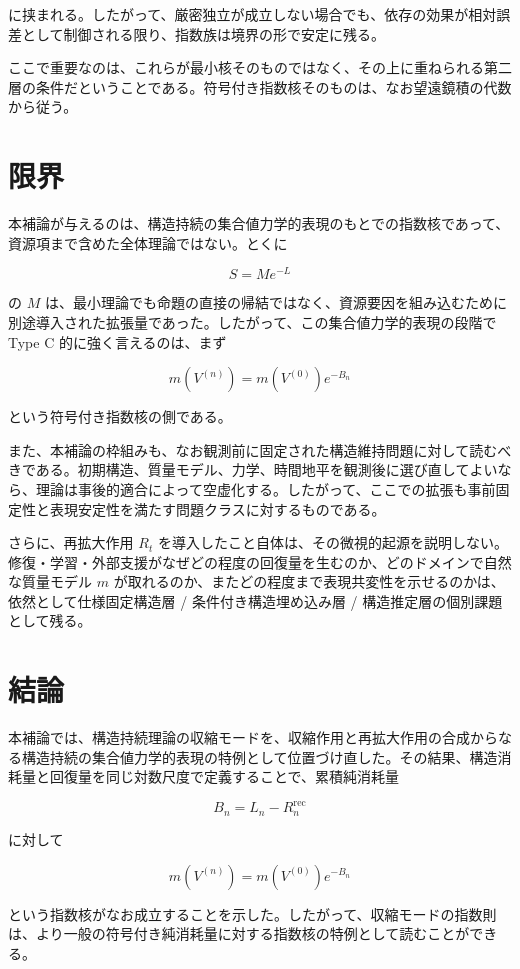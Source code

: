 \documentclass[12pt,a4paper]{article}
\begin{document}
に挟まれる。したがって、厳密独立が成立しない場合でも、依存の効果が相対誤差として制御される限り、指数族は境界の形で安定に残る。

ここで重要なのは、これらが最小核そのものではなく、その上に重ねられる第二層の条件だということである。符号付き指数核そのものは、なお望遠鏡積の代数から従う。

\section{限界}\label{ux9650ux754c}

本補論が与えるのは、構造持続の集合値力学的表現のもとでの指数核であって、資源項まで含めた全体理論ではない。とくに

\[
S = M e^{-L}
\]

の \(M\) は、最小理論でも命題の直接の帰結ではなく、資源要因を組み込むために別途導入された拡張量であった。したがって、この集合値力学的表現の段階で Type C 的に強く言えるのは、まず

\[
m(V^{(n)}) = m(V^{(0)}) e^{-B_{n}}
\]

という符号付き指数核の側である。

また、本補論の枠組みも、なお観測前に固定された構造維持問題に対して読むべきである。初期構造、質量モデル、力学、時間地平を観測後に選び直してよいなら、理論は事後的適合によって空虚化する。したがって、ここでの拡張も事前固定性と表現安定性を満たす問題クラスに対するものである。

さらに、再拡大作用 \(R_{t}\) を導入したこと自体は、その微視的起源を説明しない。修復・学習・外部支援がなぜどの程度の回復量を生むのか、どのドメインで自然な質量モデル \(m\) が取れるのか、またどの程度まで表現共変性を示せるのかは、依然として仕様固定構造層 / 条件付き構造埋め込み層 / 構造推定層の個別課題として残る。

\section{結論}\label{ux7d50ux8ad6}

本補論では、構造持続理論の収縮モードを、収縮作用と再拡大作用の合成からなる構造持続の集合値力学的表現の特例として位置づけ直した。その結果、構造消耗量と回復量を同じ対数尺度で定義することで、累積純消耗量

\[
B_{n} = L_{n} - R_{n}^{\mathrm{rec}}
\]

に対して

\[
m(V^{(n)}) = m(V^{(0)}) e^{-B_{n}}
\]

という指数核がなお成立することを示した。したがって、収縮モードの指数則は、より一般の符号付き純消耗量に対する指数核の特例として読むことができる。
\end{document}
